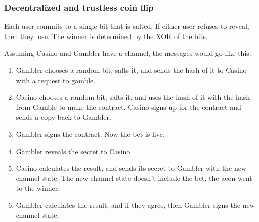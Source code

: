 \documentclass[a4paper, 10pt, conference]{ieeeconf}      %
\begin{document}
\begin{sketch}
\ifdraft
\subsubsection{Decentralized and trustless coin flip}
Each user commits to a single bit that is salted. If either user refuses to reveal, then they lose. The winner is determined by the XOR of the bits.

Assuming Casino and Gambler have a channel, the messages would go like this:
\begin{enumerate}
\item Gambler chooses a random bit, salts it, and sends the hash of it to Casino with a request to gamble.
\item Casino chooses a random bit, salts it, and uses the hash of it with the hash from Gamble to make the contract. Casino signs up for the contract and sends a copy back to Gambler.
\item Gambler signs the contract. Now the bet is live.
\item Gambler reveals the secret to Casino
\item Casino calculates the result, and sends its secret to Gambler with the new channel state. The new channel state doesn't include the bet, the aeon went to the winner.
\item Gambler calculates the result, and if they agree, then Gambler signs the new channel state.
\end{enumerate}



\end{sketch}
\end{document}
